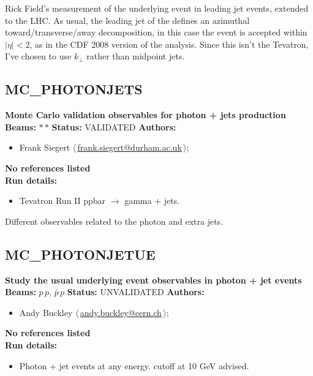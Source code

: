 \noindent Rick Field's measurement of the underlying event in leading jet events, extended to the LHC. As usual, the leading jet of the defines an azimuthal toward/transverse/away decomposition, in this case the event is accepted within $|\eta| < 2$, as in the CDF 2008 version of the analysis. Since this isn't the Tevatron, I've chosen to use $k_\perp$ rather than midpoint jets.

\clearpage


\clearpage

\subsection{MC\_PHOTONJETS}
\textbf{Monte Carlo validation observables for photon + jets production}\newline
\textbf{Beams:} $*$\,$*$ \newline
\textbf{Status:} VALIDATED\newline
\textbf{Authors:}
\begin{itemize}
  \item Frank Siegert $\langle\,$\href{mailto:frank.siegert@durham.ac.uk}{frank.siegert@durham.ac.uk}$\,\rangle$;
\end{itemize}
\textbf{No references listed}\\ 
\textbf{Run details:}
\begin{itemize}

  \item Tevatron Run II ppbar \ensuremath{\to} gamma + jets.\end{itemize}

\noindent Different observables related to the photon and extra jets.

\clearpage


\clearpage

\subsection{MC\_PHOTONJETUE}
\textbf{Study the usual underlying event observables in photon + jet events}\newline
\textbf{Beams:} $p$\,$p$, $\bar{p}$\,$p$ \newline
\textbf{Status:} UNVALIDATED\newline
\textbf{Authors:}
\begin{itemize}
  \item Andy Buckley $\langle\,$\href{mailto:andy.buckley@cern.ch}{andy.buckley@cern.ch}$\,\rangle$;
\end{itemize}
\textbf{No references listed}\\ 
\textbf{Run details:}
\begin{itemize}

  \item Photon + jet events at any energy. \pT cutoff at 10 GeV advised.\end{itemize}

